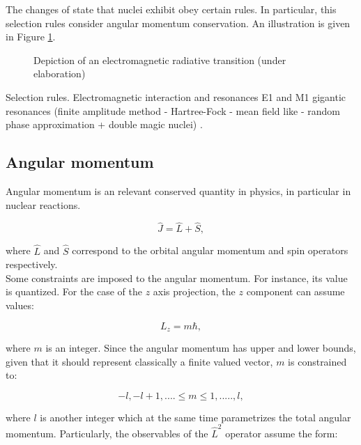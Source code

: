 \documentclass[openany]{book}
\begin{document}
The changes of state that nuclei exhibit obey certain rules. In particular, this selection rules consider angular momentum conservation. An illustration is given in Figure \ref{fig:radiativeEMTransition}. \\

\begin{figure}[H]
	
	\caption[Radiative transition illustration]{Depiction of an electromagnetic radiative transition (under elaboration)}
	\label{fig:radiativeEMTransition}
\end{figure}

Selection rules. Electromagnetic interaction and resonances E1 and M1 gigantic resonances (finite amplitude method - Hartree-Fock - mean field like - random phase approximation + double magic nuclei) \cite{sasaki_kawano_stetcu_2022}.

\subsection{Angular momentum}  \label{sub:quantumAngularMomentum}

Angular momentum is an relevant conserved quantity in physics, in particular in nuclear reactions.

\begin{equation} \label{eq:angularMomentum_definition}
	\hat J = \hat L + \hat S,
\end{equation}

where $\hat L$ and $\hat S$ correspond to the orbital angular momentum and spin operators respectively. \\

Some constraints are imposed to the angular momentum. For instance, its value is quantized. For the case of the $z$ axis projection, the $z$ component can assume values:

\begin{equation} \label{eq:angularMomentum_Lz}
	L_z = m\hbar, 
\end{equation}

where $m$ is an integer. Since the angular momentum has upper and lower bounds, given that it should represent classically a finite valued vector, $m$ is constrained to: 

\begin{equation} \label{eq:angularMomentum_mConstraint}
	-l, -l + 1, .... \leq m \leq 1, ....., l,
\end{equation}

where $l$ is another integer which at the same time parametrizes the total angular momentum. Particularly, the observables of the $\hat L^2$ operator assume the form:
\end{document}
